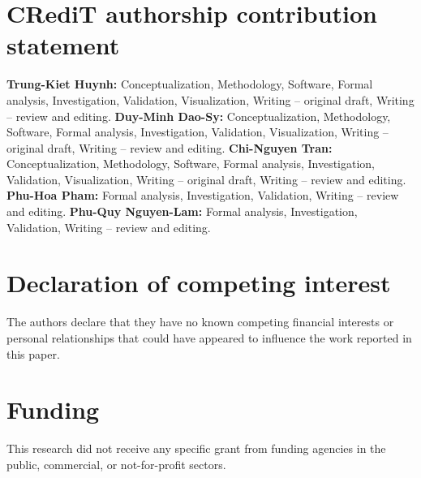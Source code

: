 
\section*{CRediT authorship contribution statement}

\textbf{Trung-Kiet Huynh:} Conceptualization, Methodology, Software, Formal
analysis, Investigation, Validation, Visualization, Writing -- original draft,
Writing -- review and editing.
\textbf{Duy-Minh Dao-Sy:} Conceptualization, Methodology, Software, Formal
analysis, Investigation, Validation, Visualization, Writing -- original draft,
Writing -- review and editing.
\textbf{Chi-Nguyen Tran:} Conceptualization, Methodology, Software, Formal
analysis, Investigation, Validation, Visualization, Writing -- original draft,
Writing -- review and editing.
\textbf{Phu-Hoa Pham:} Formal analysis, Investigation, Validation, Writing --
review and editing.
\textbf{Phu-Quy Nguyen-Lam:} Formal analysis, Investigation, Validation,
Writing -- review and editing.

\section*{Declaration of competing interest}

The authors declare that they have no known competing financial interests or
personal relationships that could have appeared to influence the work reported
in this paper.

\section*{Funding}

This research did not receive any specific grant from funding agencies in the
public, commercial, or not-for-profit sectors.


